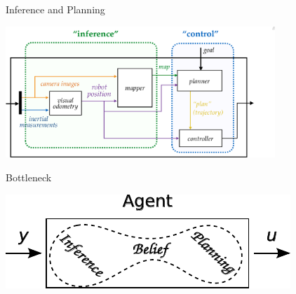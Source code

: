 \begin{tframe}{Inference and Planning}
\begin{center}
\includegraphics[width=4in]{media_minrep/censi_diag}
\end{center}
\end{tframe}

\begin{tframe}{Bottleneck}
\begin{center}
\includegraphics{media_minrep/agent}

\bigskip
{}
\end{center}
\end{tframe}

